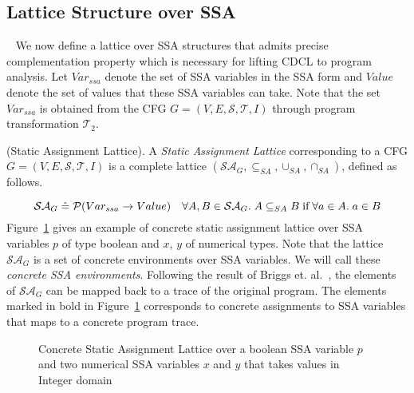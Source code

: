 \subsection{Lattice Structure over SSA}~\label{state-transformer}
%
We now define a lattice over SSA structures that admits precise complementation 
property which is necessary for lifting CDCL to program analysis. Let
$Var_{ssa}$ denote the set of SSA variables in the SSA form and $Value$ denote the
set of values that these SSA variables can take.  Note that the set $Var_{ssa}$ is
obtained from the CFG $G= (V, E, \mathcal{S}, \mathcal{T}, I)$ through program
transformation $\mathcal{T}_2$. 
%
\begin{definition} (Static Assignment Lattice). A \emph{Static Assignment Lattice}
  corresponding to a CFG $G= (V, E, \mathcal{S}, \mathcal{T}, I)$ is a complete 
  lattice $(\mathcal{SA}_{G}, \subseteq_{SA}, \cup_{SA}, \cap_{SA})$, defined 
  as follows.
\end{definition}
%
  \[
    \mathcal{SA}_{G} \mathrel{\hat=} \mathcal{P}(Var_{ssa} \rightarrow Value)
    \quad \forall A,B \in
    \mathcal{SA}_{G}.\; A \subseteq_{SA} B\; \text{if}\; \forall a \in A.\; 
    a \in B 
  \]
\rmcmt{  
  \[
    A \cap_{SA} B \mathrel{\hat=} \lambda\; x. ( \{f(x) \cap g(x) \mid 
    f \in A, g \in B \}) 
    \qquad 
    A \cup_{SA} B \mathrel{\hat=} \lambda\; x. ( \{f(x) \cup g(x) \mid 
    f \in A, g \in B \}) 
  \]
}
%
%
Figure~\ref{fig:concrete} gives an example of concrete static assignment lattice
over SSA variables $p$ of type boolean and $x$, $y$ of numerical types. Note
that the lattice $\mathcal{SA}_G$ is a set of concrete environments over SSA
variables.  We will call these \emph{concrete SSA environments}.  Following the
result of Briggs et. al.~\cite{Briggs:1998}, the elements of $\mathcal{SA}_G$
can be mapped back to a trace of the original program.  The elements marked in bold 
in Figure~\ref{fig:concrete} corresponds to concrete assignments to SSA variables 
that maps to a concrete program trace. 
%
\begin{figure}[htbp]
\centering
\vspace*{-0.2cm}
\caption{Concrete Static Assignment Lattice over a boolean SSA variable $p$ and two
  numerical SSA variables $x$ and $y$ that takes values in Integer domain \label{fig:concrete}}
\end{figure}
%



